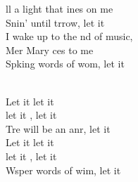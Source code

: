 \documentclass[12pt]{article}
\begin{document}
\begin{multicols*}{2}
\begin{cancion}
	ll a light that ines on me\\
	Snin' until trrow, let it  \\
	I wake up to the nd of music, \\
	Mer Mary ces to me\\
	Spking words of wom, let it  \\\jump\\
	\begin{chorus}%
	Let it  let it \\
	let it , let it \\
	Tre will be an anr, let it \\
	Let it  let it \\
	let it , let it \\
	Wsper words of wim, let it \\
	\end{chorus}%
	\jump\\
\end{cancion}%


\end{multicols*}
\end{document}
